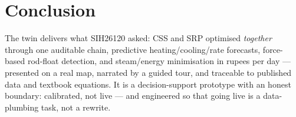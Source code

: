 \documentclass[12pt,a4paper]{report}
\begin{document}
\chapter*{Conclusion}
The twin delivers what SIH26120 asked: CSS and SRP optimised \emph{together}
through one auditable chain, predictive heating/cooling/rate forecasts,
force-based rod-float detection, and steam/energy minimisation in rupees per
day --- presented on a real map, narrated by a guided tour, and traceable to
published data and textbook equations. It is a decision-support prototype with
an honest boundary: calibrated, not live --- and engineered so that going live
is a data-plumbing task, not a rewrite.

\end{document}
